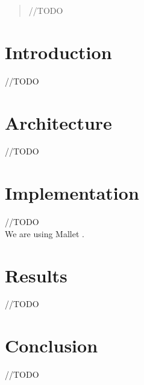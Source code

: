 \documentclass[letterpaper]{article}
\author{Michael Fulker, Anthony Hauber \and Tyson Williams \\
COM S 472 : Principles of Artificial Intelligence\\Department of Computer Science\\ Iowa State University, Ames, IA 50011\\
\texttt{\{calculo, thauber, tyson\}@cs.iastate.edu}}
\begin{document}
\maketitle

\begin{abstract}
 //TODO
\end{abstract}


\section{Introduction}
//TODO

\section{Architecture}
//TODO

\section{Implementation}
//TODO\\
We are using Mallet \cite{McCallumMALLET}.

\section{Results}
//TODO

\section{Conclusion}
//TODO




\end{document}
